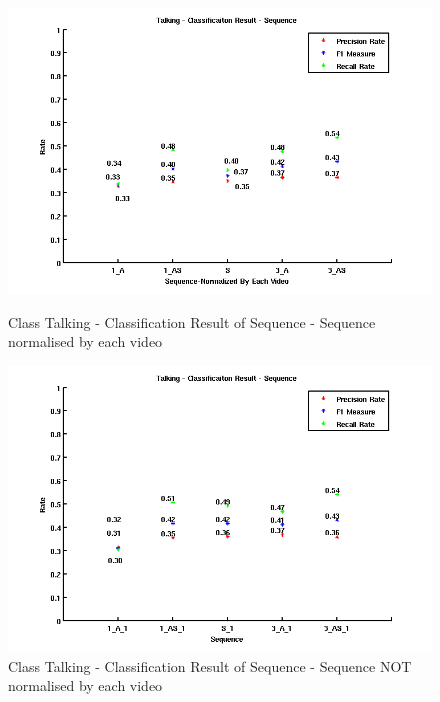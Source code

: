 \begin{figure}[ht]
\centering
\begin{minipage}{.5\textwidth}
  \centering
  \captionsetup{justification=centering, margin=1cm}
  \includegraphics[width=\linewidth]{imgs/Result_Talking_Sequence.png}
  \caption{Class Talking - Classification Result of Sequence - Sequence normalised by each video}
  \label{fig:RTS}
\end{minipage}%
\begin{minipage}{.5\textwidth}
  \centering
  \captionsetup{justification=centering, margin=1cm}
  \includegraphics[width=\linewidth]{imgs/Result_Talking_Sequence_1.png}
  \caption{Class Talking - Classification Result of Sequence - Sequence NOT normalised by each video}
  \label{fig:RTS1}
\end{minipage}
\end{figure}
\newline

